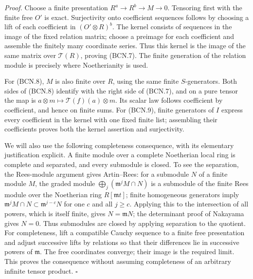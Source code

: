 \emph{Proof.}
Choose a finite presentation \(R^a\to R^b\to M\to0\).
Tensoring first with the finite free \(O'\) is exact.  Surjectivity
onto coefficient sequences follows by choosing a lift of each
coefficient in \((O'\otimes R)^b\).  The kernel consists of
sequences in the image of the fixed relation matrix; choose
a preimage for each coefficient and assemble the finitely many
coordinate series.  Thus this kernel is the image of the same
matrix over \(\mathscr T(R)\), proving (BCN.7).
The finite generation of the relation module is precisely where
Noetherianity is used.

For (BCN.8), \(M\) is also finite over \(R\), using the same
finite \(S\)-generators.  Both sides of (BCN.8) identify with the
right side of (BCN.7), and on a pure tensor the map is
\(a\otimes m\mapsto\mathscr T(f)(a)\otimes m\).
Its scalar law follows coefficient by coefficient, and hence on
finite sums.  For (BCN.9), finite generators of \(I\) express
every coefficient in the kernel with one fixed finite list;
assembling their coefficients proves both the kernel assertion
and surjectivity.

We will also use the following completeness consequence, with
its elementary justification explicit.  A finite module over
a complete Noetherian local ring is complete and separated,
and every submodule is closed.  To see the separation, the
Rees-module argument gives Artin--Rees: for a submodule \(N\)
of a finite module \(M\), the graded module
\(\bigoplus_j(\mathfrak m^jM\cap N)\) is a submodule of the
finite Rees module over the Noetherian ring
\(R[\mathfrak m t]\); finite homogeneous generators imply
\(\mathfrak m^jM\cap N\subset\mathfrak m^{j-c}N\) for one \(c\)
and all \(j\ge c\).  Applying this to the intersection of all
powers, which is itself finite, gives \(N=\mathfrak m N\);
the determinant proof of Nakayama gives \(N=0\).
Thus submodules are closed by applying separation to the
quotient.  For completeness, lift a compatible Cauchy sequence
to a finite free presentation and adjust successive lifts by
relations so that their differences lie in successive powers
of \(\mathfrak m\).  The free coordinates converge; their image
is the required limit.  This proves the consequence without
assuming completeness of an arbitrary infinite tensor product.
\hfill\(\square\)

